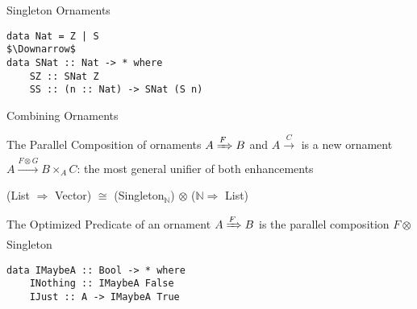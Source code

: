 \documentclass{beamer}
\newcommand{\NN}{\mathbb{N}}
\begin{document}
\begin{frame}[fragile]{Singleton Ornaments}
\begin{lstlisting}
data Nat = Z | S
$\Downarrow$
data SNat :: Nat -> * where
    SZ :: SNat Z
    SS :: (n :: Nat) -> SNat (S n)
\end{lstlisting}

\end{frame}

\begin{frame}[fragile]{Combining Ornaments}
\begin{definition}
The \alert{Parallel Composition} of ornaments $A \xRightarrow{F} B$ and $A \xrightarrow{C}$ is a new ornament $A \xrightarrow{F \otimes G} B \times_{A} C$: the most general unifier of both enhancements
\end{definition}
\pause
\begin{example}[Vectors]
\item (List $\Rightarrow$ Vector) $\cong$ (Singleton$_\NN$) $\otimes$ ($\NN \Rightarrow$ List)
\end{example}
\pause
\begin{definition}
The \alert{Optimized Predicate} of an ornament $A \xRightarrow{F} B$ is the parallel composition $F \otimes $ Singleton
\end{definition}
\begin{example}
\begin{lstlisting}
data IMaybeA :: Bool -> * where
    INothing :: IMaybeA False
    IJust :: A -> IMaybeA True
\end{lstlisting}
\end{example}

\end{frame}
\end{document}
